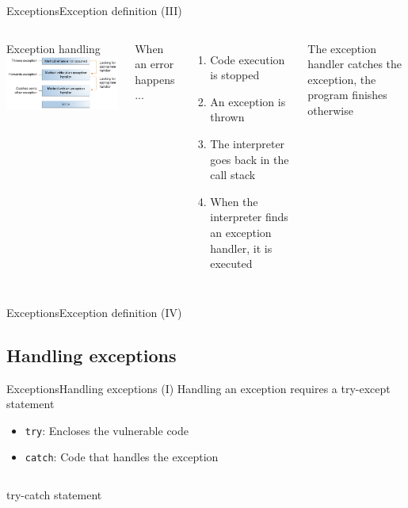 \documentclass[10pt,compress]{beamer} %
\begin{document}
\begin{frame}{Exceptions}{Exception definition (III)}
    \begin{columns}
		\centering Exception handling
		\includegraphics[width=0.8\linewidth]{figs/exceptions-errorOccurs.png}

		When an error happens ...
		\begin{enumerate}
		\item Code execution is stopped
		\item An exception is thrown
		\item The interpreter goes back in the call stack
		\item When the interpreter finds an exception handler, it is executed
		\end{enumerate}
		The exception handler catches the exception, the program finishes otherwise
	\end{columns}
\end{frame}

\begin{frame}{Exceptions}{Exception definition (IV)}
	
\end{frame}

\subsection{Handling exceptions}
\begin{frame}{Exceptions}{Handling exceptions (I)}
	Handling an exception requires a try-except statement
	\begin{itemize}
		\item \texttt{try}: Encloses the vulnerable code
		\item \texttt{catch}: Code that handles the exception
	\end{itemize}

    \begin{columns}
	\begin{block}{try-catch statement}
	\vspace{-0.2cm}
		
	\vspace{-0.2cm}
	\end{block}
	\end{columns}
\end{frame}
\end{document}
